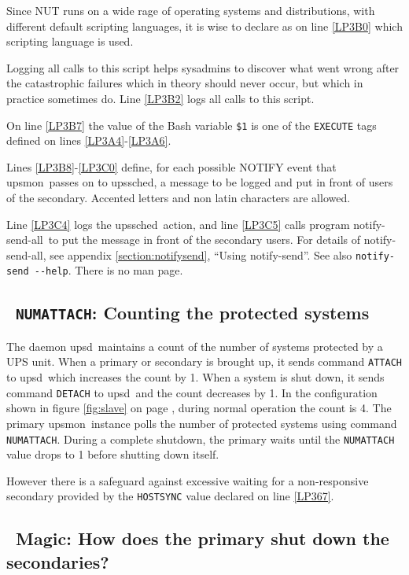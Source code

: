 \documentclass[12pt]{article}
\newlength{\headersep}\setlength{\headersep}{3mm}
\newcommand{\Hsep}{\hspace{\headersep}}
\newcommand{\newcolumn}{\vfill\eject}
\newcommand{\upsd}{\mbox{\textcolor{UPSDCOLOUR}{upsd}}}
\newcommand{\upsmon}{\mbox{\textcolor{MONCOLOUR}{upsmon}}}
\newcommand{\upssched}{\mbox{\textcolor{SCHEDCOLOUR}{upssched}}}
\newcommand{\notifysend}{\mbox{\textcolor{NOTIFYCOLOUR}{notify-send}}}
\newcommand{\notifysendall}{\mbox{\textcolor{NOTIFYCOLOUR}{notify-send-all}}}
\begin{document}
Since NUT runs on a wide rage of operating systems and distributions, with
different default scripting languages, it is wise to declare as on line
\ref{LP3B0} which scripting language is used.

Logging all calls to this script helps sysadmins to discover what went wrong
after the catastrophic failures which in theory should never occur, but which
in practice sometimes do.  Line \ref{LP3B2} logs all calls to this script.

On line \ref{LP3B7} the value of the Bash variable \texttt{\$1} is one of the
\texttt{EXECUTE} tags defined on lines \ref{LP3A4}-\ref{LP3A6}.

Lines \ref{LP3B8}-\ref{LP3C0} define, for each possible NOTIFY event that
\upsmon\ passes on to \upssched, a message to be logged and put in front of
users of the secondary.  Accented letters and non latin characters are allowed.

Line \ref{LP3C4} logs the \upssched\ action, and line \ref{LP3C5} calls
program \notifysendall\ to put the message in front of the secondary users.  For
details of \notifysendall, see appendix \ref{section:notifysend}, ``Using
\notifysend''.  See also \texttt{notify-send -\/-help}.  There is no man page.

\newcolumn
\subsection{\Hsep\ \texttt{NUMATTACH}: Counting the protected systems}\label{section:numattach}

The daemon \upsd\ maintains a count of the number of systems protected
by a UPS unit.  When a primary or secondary is brought up, it sends
command \texttt{ATTACH} to \upsd\ which increases the count by 1.
When a system is shut down, it sends command \texttt{DETACH} to
\upsd\ and the count decreases by 1.  In the configuration shown in
figure \ref{fig:slave} on page \pageref{fig:slave}, during normal
operation the count is 4.  The primary \upsmon\ instance polls the
number of protected systems using command \texttt{NUMATTACH}.  During
a complete shutdown, the primary waits until the \texttt{NUMATTACH}
value drops to 1 before shutting down itself.

However there is a safeguard against excessive waiting for a
non-responsive secondary provided by the \texttt{HOSTSYNC} value
declared on line \ref{LP367}.

\subsection{\Hsep\ Magic: How does the primary shut down the secondaries?}\label{section:magic}
\end{document}
